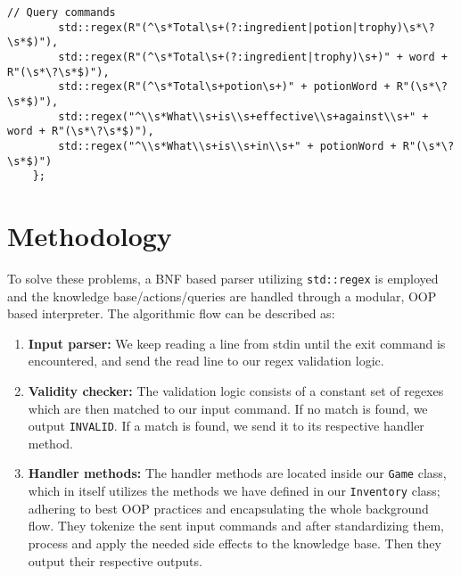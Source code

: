 \documentclass[a4paper,12pt]{article}
\begin{document}
\begin{lstlisting}[style=CStyle]
        // Query commands
        std::regex(R"(^\s*Total\s+(?:ingredient|potion|trophy)\s*\?\s*$)"),
        std::regex(R"(^\s*Total\s+(?:ingredient|trophy)\s+)" + word + R"(\s*\?\s*$)"),
        std::regex(R"(^\s*Total\s+potion\s+)" + potionWord + R"(\s*\?\s*$)"),
        std::regex("^\\s*What\\s+is\\s+effective\\s+against\\s+" + word + R"(\s*\?\s*$)"),
        std::regex("^\\s*What\\s+is\\s+in\\s+" + potionWord + R"(\s*\?\s*$)")
    };
\end{lstlisting}

\section{Methodology}
To solve these problems, a BNF based parser utilizing \texttt{std::regex} is employed and the knowledge base/actions/queries are handled through a modular, OOP based interpreter. The algorithmic flow can be described as:
\begin{enumerate}[topsep=0.5ex, partopsep=0pt, parsep=0pt, itemsep=0.5ex]
    \item \textbf{Input parser:} We keep reading a line from stdin until the exit command is encountered, and send the read line to our regex validation logic.
    \item \textbf{Validity checker:} The validation logic consists of a constant set of regexes which are then matched to our input command. If no match is found, we output \verb|INVALID|. If a match is found, we send it to its respective handler method.
    \item \textbf{Handler methods:} The handler methods are located inside our \verb|Game| class, which in itself utilizes the methods we have defined in our \verb|Inventory| class; adhering to best OOP practices and encapsulating the whole background flow. They tokenize the sent input commands and after standardizing them, process and apply the needed side effects to the knowledge base. Then they output their respective outputs.
\end{enumerate}
\end{document}
